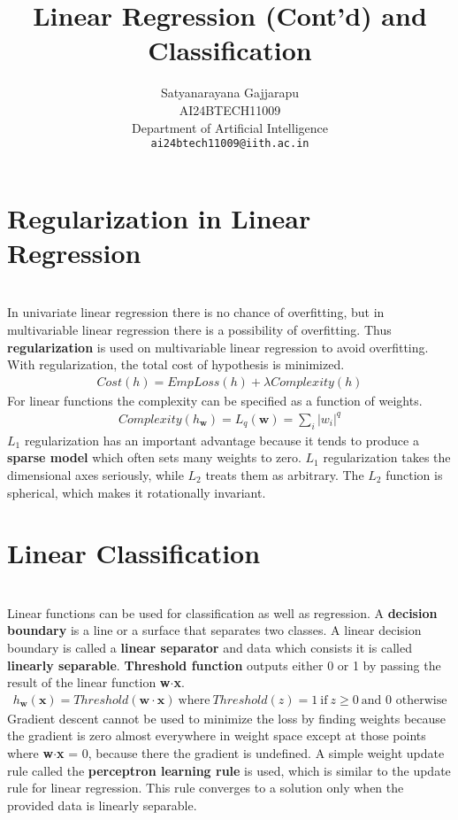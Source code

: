 \documentclass{article}
\title{Linear Regression (Cont'd) and Classification}
\author{%
Satyanarayana Gajjarapu \\
AI24BTECH11009 \\
Department of Artificial Intelligence \\
\texttt{ai24btech11009@iith.ac.in} \\
}
\begin{document}
\maketitle
\section{Regularization in Linear Regression}
\begin{paragraph}
\\
In univariate linear regression there is no chance of overfitting, but in multivariable linear regression there is a possibility of overfitting. Thus \textbf{regularization} is used on multivariable linear regression to avoid overfitting. With regularization, the total cost of hypothesis is minimized.
\begin{align*}
    Cost(h) = EmpLoss(h) + \lambda Complexity(h)
\end{align*}
For linear functions the complexity can be specified as a function of weights.
\begin{align*}
    Complexity(h_\textbf{w}) = L_q(\textbf{w}) = \sum\limits_{i} |w_i|^q
\end{align*}
$L_1$ regularization has an important advantage because it tends to produce a \textbf{sparse model} which often sets many weights to zero. $L_1$ regularization takes the dimensional axes seriously, while $L_2$ treats them as arbitrary. The $L_2$ function is spherical, which makes it rotationally invariant.
\end{paragraph}
\section{Linear Classification}
\begin{paragraph}
\\
Linear functions can be used for classification as well as regression. A \textbf{decision boundary} is a line or a surface that separates two classes. A linear decision boundary is called a \textbf{linear separator} and data which consists it is called \textbf{linearly separable}. \textbf{Threshold function} outputs either 0 or 1 by passing the result of the linear function \textbf{w}$\cdot$\textbf{x}. 
\begin{align*}
    h_\textbf{w}(\textbf{x}) = Threshold(\textbf{w}\cdot\textbf{x}) \ \text{where} \ Threshold(z) = 1 \ \text{if} \ z\geq0 \ \text{and 0 otherwise}
\end{align*}
Gradient descent cannot be used to minimize the loss by finding weights because the gradient is zero almost everywhere in weight space except at those points where \textbf{w}$\cdot$\textbf{x} = 0, because there the gradient is undefined. A simple weight update rule called the \textbf{perceptron learning rule} is used, which is similar to the update rule for linear regression. This rule converges to a solution only when the provided data is linearly separable.
\end{paragraph}
\end{document}
